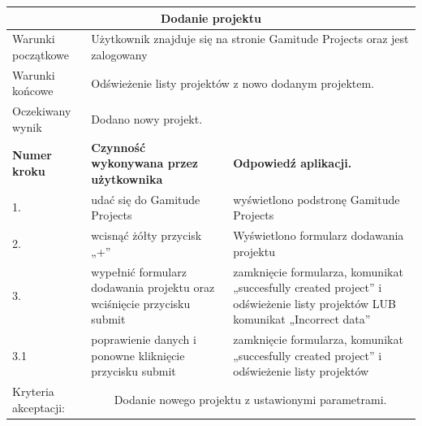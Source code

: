 \documentclass[a4paper,11pt]{report}
\begin{document}
\begin{table}[H]
	\centering
	\begin{tabular}{|p{2cm}|p{6cm}|p{6cm}|}
	\hline
	\multicolumn{3}{|c|}{\textbf{Dodanie projektu}}\\
	\hline
	Warunki początkowe & \multicolumn{2}{|p{12cm}|}{Użytkownik znajduje się na stronie Gamitude Projects oraz jest zalogowany}\\
	\hline
	Warunki końcowe & \multicolumn{2}{|p{12cm}|}{Odświeżenie listy projektów z nowo dodanym projektem.}\\
	\hline
	Oczekiwany wynik & \multicolumn{2}{|p{12cm}|}{Dodano nowy projekt.}\\
	\hline
	\textbf{Numer kroku} & \textbf{Czynność wykonywana przez użytkownika} & \textbf{Odpowiedź aplikacji.} \\
	\hline
	1. & udać się do Gamitude Projects & wyświetlono podstronę Gamitude Projects \\
	\hline
	2. & wcisnąć żółty przycisk „+” & Wyświetlono formularz dodawania projektu \\
	\hline
	3. & wypełnić formularz dodawania projektu oraz wciśnięcie przycisku submit & zamknięcie formularza, komunikat „succesfully created project” i odświeżenie listy projektów LUB komunikat „Incorrect data” \\
	\hline
	3.1 & poprawienie danych i ponowne kliknięcie przycisku submit & zamknięcie formularza, komunikat „succesfully created project” i odświeżenie listy projektów \\
	\hline
	Kryteria akceptacji: & \multicolumn{2}{|c|}{Dodanie nowego projektu z ustawionymi parametrami.} \\
	\hline
	\end{tabular}
\end{table}
\end{document}
